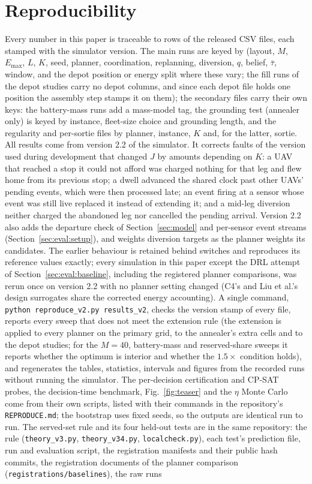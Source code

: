 \documentclass[journal,outdir=./]{IEEEtran}
\newcommand{\Emax}{E_{\max}}
\begin{document}
\section{Reproducibility}
Every number in this paper is traceable to rows of the released CSV files, each stamped with the simulator version. The main runs are keyed by (layout, $M$, $\Emax$, $L$, $K$, seed, planner, coordination, replanning, diversion, $q$, belief, $\bar\tau$, window, and the depot position or energy split where these vary; the fill runs of the depot studies carry no depot columns, and since each depot file holds one position the assembly step stamps it on them); the secondary files carry their own keys: the battery-mass runs add a mass-model tag, the grounding test (annealer only) is keyed by instance, fleet-size choice and grounding length, and the regularity and per-sortie files by planner, instance, $K$ and, for the latter, sortie. All results come from version 2.2 of the simulator. It corrects faults of the version used during development that changed $J$ by amounts depending on $K$: a UAV that reached a stop it could not afford was charged nothing for that leg and flew home from its previous stop; a dwell advanced the shared clock past other UAVs' pending events, which were then processed late; an event firing at a sensor whose event was still live replaced it instead of extending it; and a mid-leg diversion neither charged the abandoned leg nor cancelled the pending arrival. Version 2.2 also adds the departure check of Section~\ref{sec:model} and per-sensor event streams (Section~\ref{sec:eval:setup}), and weights diversion targets as the planner weights its candidates. The earlier behaviour is retained behind switches and reproduces its reference values exactly; every simulation in this paper except the DRL attempt of Section~\ref{sec:eval:baseline}, including the registered planner comparisons, was rerun once on version 2.2 with no planner setting changed (C4's and Liu et al.'s design surrogates share the corrected energy accounting). A single command, \texttt{python reproduce\_v2.py results\_v2}, checks the version stamp of every file, reports every sweep that does not meet the extension rule (the extension is applied to every planner on the primary grid, to the annealer's extra cells and to the depot studies; for the $M=40$, battery-mass and reserved-share sweeps it reports whether the optimum is interior and whether the $1.5\times$ condition holds), and regenerates the tables, statistics, intervals and figures from the recorded runs without running the simulator. The per-decision certification and CP-SAT probes, the decision-time benchmark, Fig.~\ref{fig:teaser} and the $\eta$ Monte Carlo come from their own scripts, listed with their commands in the repository's \texttt{REPRODUCE.md}; the bootstrap uses fixed seeds, so the outputs are identical run to run. The served-set rule and its four held-out tests are in the same repository: the rule (\texttt{theory\_v3.py}, \texttt{theory\_v34.py}, \texttt{localcheck.py}), each test's prediction file, run and evaluation script, the registration manifests and their public hash commits, the registration documents of the planner comparison (\texttt{registrations/baselines}), the raw runs 
\end{document}
